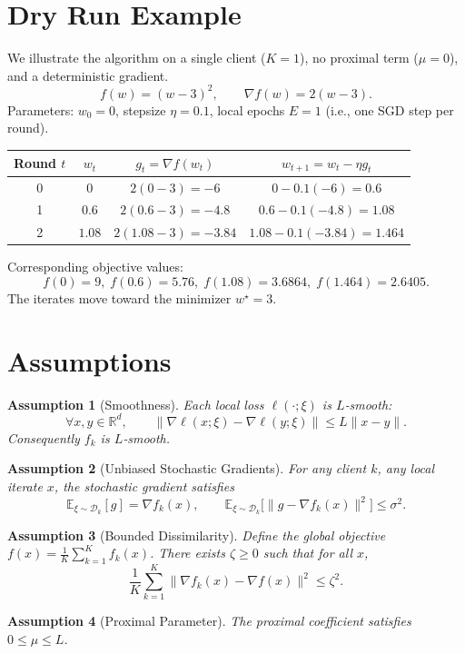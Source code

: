 \documentclass{article}
\newtheorem{assumption}{Assumption}
\newcommand{\EE}{\mathbb{E}}
\newcommand{\RR}{\mathbb{R}}
\begin{document}
\section*{Dry Run Example}
We illustrate the algorithm on a single client ($K=1$), no proximal term ($\mu=0$), and a deterministic gradient.
\[
f(w)=(w-3)^2,\qquad \nabla f(w)=2(w-3).
\]
Parameters: $w_0=0$, stepsize $\eta=0.1$, local epochs $E=1$ (i.e., one SGD step per round).  

\begin{tabular}{c|c|c|c}
\textbf{Round $t$} & $w_t$ & $g_t=\nabla f(w_t)$ & $w_{t+1}=w_t-\eta g_t$ \\ \hline
0 & $0$ & $2(0-3)=-6$ & $0-0.1(-6)=0.6$ \\
1 & $0.6$ & $2(0.6-3)=-4.8$ & $0.6-0.1(-4.8)=1.08$ \\
2 & $1.08$ & $2(1.08-3)=-3.84$ & $1.08-0.1(-3.84)=1.464$ \\
\end{tabular}

Corresponding objective values:
\[
f(0)=9,\; f(0.6)=5.76,\; f(1.08)=3.6864,\; f(1.464)=2.6405.
\]
The iterates move toward the minimizer $w^\star=3$.

\newpage
\section*{Assumptions}
\begin{assumption}[Smoothness]\label{as:smooth}
Each local loss $\ell(\cdot;\xi)$ is $L$‑smooth:
\[
\forall x,y\in\RR^d,\qquad
\|\nabla \ell(x;\xi)-\nabla \ell(y;\xi)\|\le L\|x-y\|.
\]
Consequently $f_k$ is $L$‑smooth.
\end{assumption}

\begin{assumption}[Unbiased Stochastic Gradients]\label{as:unbiased}
For any client $k$, any local iterate $x$, the stochastic gradient satisfies
\[
\EE_{\xi\sim\mathcal D_k}[g]=\nabla f_k(x),\qquad
\EE_{\xi\sim\mathcal D_k}\bigl[\|g-\nabla f_k(x)\|^2\bigr]\le\sigma^2.
\]
\end{assumption}

\begin{assumption}[Bounded Dissimilarity]\label{as:dissimilarity}
Define the global objective $f(x)=\frac1K\sum_{k=1}^K f_k(x)$.  
There exists $\zeta\ge0$ such that for all $x$,
\[
\frac1K\sum_{k=1}^K\|\nabla f_k(x)-\nabla f(x)\|^2\le \zeta^2.
\]
\end{assumption}

\begin{assumption}[Proximal Parameter]\label{as:mu}
The proximal coefficient satisfies $0\le\mu\le L$.
\end{assumption}
\end{document}
